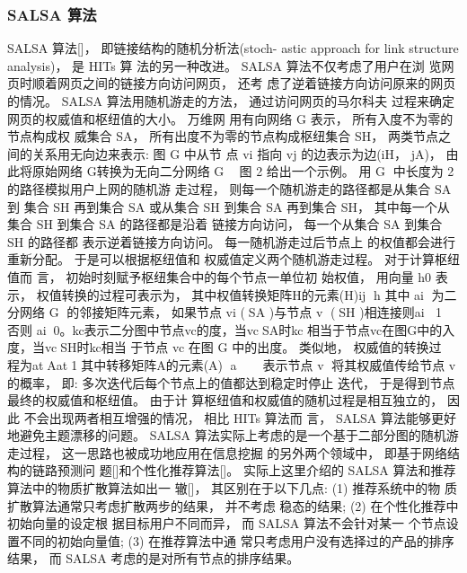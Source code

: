 	\subsubsection{SALSA 算法}
	SALSA 算法[]， 即链接结构的随机分析法(stoch- astic approach for link structure analysis)， 是 HITs 算 法的另一种改进。 SALSA 算法不仅考虑了用户在浏 览网页时顺着网页之间的链接方向访问网页， 还考 虑了逆着链接方向访问原来的网页的情况。 SALSA 算法用随机游走的方法， 通过访问网页的马尔科夫 过程来确定网页的权威值和枢纽值的大小。 万维网 用有向网络 G 表示， 所有入度不为零的节点构成权 威集合 SA， 所有出度不为零的节点构成枢纽集合 SH， 两类节点之间的关系用无向边来表示: 图 G 中从节 点 vi 指向 vj 的边表示为边(iH， jA)， 由此将原始网络 G转换为无向二分网络 G ， 图 2 给出一个示例。
				用 G 中长度为 2 的路径模拟用户上网的随机游 走过程， 则每一个随机游走的路径都是从集合 SA 到 集合 SH 再到集合 SA 或从集合 SH 到集合 SA 再到集合 SH， 其中每一个从集合 SH 到集合 SA 的路径都是沿着 链接方向访问， 每一个从集合 SA 到集合 SH 的路径都 表示逆着链接方向访问。 每一随机游走过后节点上 的权值都会进行重新分配。 于是可以根据枢纽值和 权威值定义两个随机游走过程。 对于计算枢纽值而 言， 初始时刻赋予枢纽集合中的每个节点一单位初 始权值， 用向量 h0 表示， 权值转换的过程可表示为， 其中权值转换矩阵H的元素(H)ij h
				其中 ai 为二分网络 G 的邻接矩阵元素， 如果节点 vi (SA )与节点 v (SH )相连接则ai 1， 否则 ai0。kc表示二分图中节点vc的度，当vcSA时kc 相当于节点vc在图G中的入度，当vcSH时kc相当 于节点 vc 在图 G 中的出度。 类似地， 权威值的转换过 程为atAat1，其中转移矩阵A的元素(A) a  表示节点 v 将其权威值传给节点 v 的概率， 即:
				多次迭代后每个节点上的值都达到稳定时停止 迭代， 于是得到节点最终的权威值和枢纽值。 由于计 算枢纽值和权威值的随机过程是相互独立的， 因此 不会出现两者相互增强的情况， 相比 HITs 算法而 言， SALSA 算法能够更好地避免主题漂移的问题。 SALSA 算法实际上考虑的是一个基于二部分图的随机游走过程， 这一思路也被成功地应用在信息挖掘 的另外两个领域中， 即基于网络结构的链路预测问 题[]和个性化推荐算法[]。 实际上这里介绍的 SALSA 算法和推荐算法中的物质扩散算法如出一 辙[]， 其区别在于以下几点: (1) 推荐系统中的物 质扩散算法通常只考虑扩散两步的结果， 并不考虑 稳态的结果; (2) 在个性化推荐中初始向量的设定根 据目标用户不同而异， 而 SALSA 算法不会针对某一 个节点设置不同的初始向量值; (3) 在推荐算法中通 常只考虑用户没有选择过的产品的排序结果， 而 SALSA 考虑的是对所有节点的排序结果。

